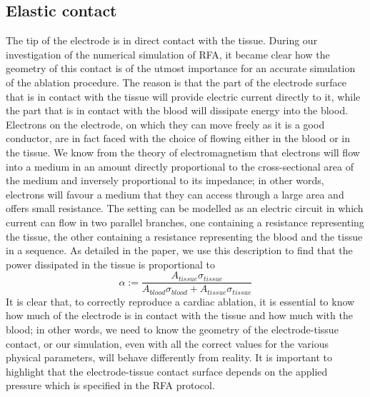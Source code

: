 \subsection{Elastic contact}
\label{sub_rfaElastic}
The tip of the electrode is in direct contact with the tissue.
During our investigation of the numerical simulation of RFA, it became clear how the geometry of this contact is of the utmost importance for an accurate simulation of the ablation procedure.
The reason is that the part of the electrode surface that is in contact with the tissue will provide electric current directly to it, while the part that is in contact with the blood will dissipate energy into the blood.
Electrons on the electrode, on which they can move freely as it is a good conductor, are in fact faced with the choice of flowing either in the blood or in the tissue.
We know from the theory of electromagnetism that electrons will flow into a medium in an amount directly proportional to the cross-sectional area of the medium and inversely proportional to its impedance; in other words, electrons will favour a medium that they can access through a large area and offers small resistance.
The setting can be modelled as an electric circuit in which current can flow in two parallel branches, one containing a resistance representing the tissue, the other containing a resistance representing the blood and the tissue in a sequence.
As detailed in the paper, we use this description to find that the power dissipated in the tissue is proportional to
\begin{equation}
  \alpha := \frac{A_{tissue}\sigma_{tissue}}{A_{blood}\sigma_{blood} + A_{tissue}\sigma_{tissue}}
  \label{eq_rfaPowerDistribution}
\end{equation}
It is clear that, to correctly reproduce a cardiac ablation, it is essential to know how much of the electrode is in contact with the tissue and how much with the blood; in other words, we need to know the geometry of the electrode-tissue contact, or our simulation, even with all the correct values for the various physical parameters, will behave differently from reality.
It is important to highlight that the electrode-tissue contact surface depends on the applied pressure which is specified in the RFA protocol.

